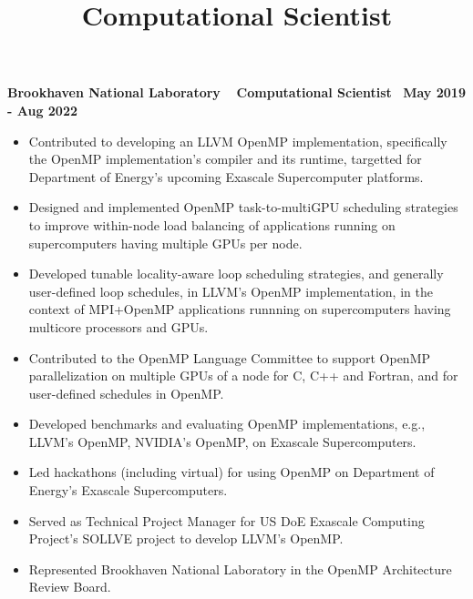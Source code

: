 \title{Computational Scientist} 
\textbf{{Brookhaven National Laboratory $\>$$\>$$\>$$\>$Computational Scientist$\>$$\>$$\>$$\>$May 2019 - Aug 2022}}
\begin{itemize}
   \item Contributed to developing an LLVM OpenMP implementation, specifically the OpenMP implementation's compiler and its runtime, targetted for Department of Energy's upcoming Exascale Supercomputer platforms. 
   \item Designed and implemented OpenMP task-to-multiGPU scheduling strategies to improve within-node load balancing of applications running on supercomputers having multiple GPUs per node.
   \item Developed tunable locality-aware loop scheduling strategies, and generally user-defined loop schedules, in LLVM's OpenMP implementation, in the context of MPI+OpenMP applications runnning on supercomputers having multicore processors and GPUs. 
   \item Contributed to the OpenMP Language Committee to support OpenMP parallelization on multiple GPUs of a node for C, C++ and Fortran, and for user-defined schedules in OpenMP.
   \item Developed benchmarks and evaluating OpenMP implementations, e.g., LLVM's OpenMP, NVIDIA's OpenMP, on Exascale Supercomputers.
   \item Led hackathons (including virtual) for using OpenMP on Department of Energy's Exascale Supercomputers.
   \item Served as Technical Project Manager for US DoE Exascale Computing Project’s SOLLVE project to develop LLVM's OpenMP.
   \item Represented Brookhaven National Laboratory in the OpenMP Architecture Review Board. 
\end{itemize}

